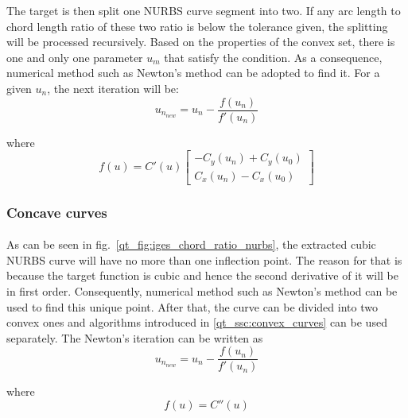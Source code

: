 The target is then split one NURBS curve segment into two.
If any arc length to chord length ratio of these two ratio is below the tolerance given, the splitting will be processed recursively.
Based on the properties of the convex set, there is one and only one parameter $u_m$ that satisfy the condition.
As a consequence, numerical method such as Newton's method can be adopted to find it.
For a given $u_n$, the next iteration will be:
    \begin{equation}
        u_{n_{new}} =  u_n - \frac{f(u_n)}{f'(u_n)}
    \end{equation}

where 
    \begin{equation}
        f(u) = C'(u) \begin{bmatrix}
            - C_y(u_n) + C_y(u_0) \\
            C_x(u_n) - C_x(u_0)
        \end{bmatrix}
    \end{equation}


\subsubsection{Concave curves}
\paragraph{}
As can be seen in fig.~\ref{qt_fig:iges_chord_ratio_nurbs}, the extracted cubic NURBS curve will have no more than one inflection point.
The reason for that is because the target function is cubic and hence the second derivative of it will be in first order.
Consequently, numerical method such as Newton's method can be used to find this unique point.
After that, the curve can be divided into two convex ones and algorithms introduced in \ref{qt_ssc:convex_curves} can be used separately.
The Newton's iteration can be written as
    \begin{equation}
        u_{n_{new}} = u_n - \frac{f(u_n)}{f'(u_n)}
    \end{equation}

where
    \begin{equation}
        f(u) = C''(u)
    \end{equation}

